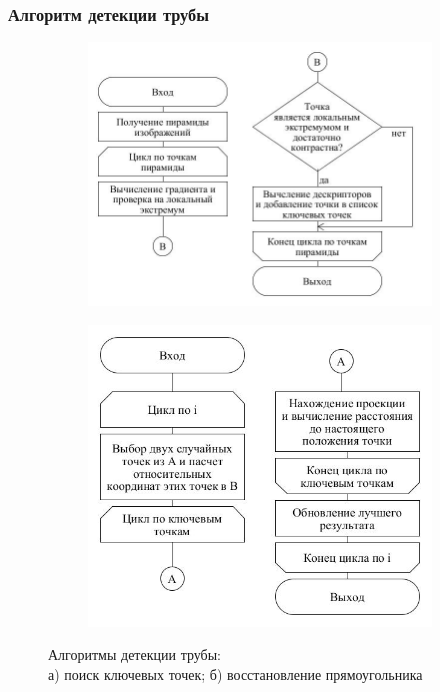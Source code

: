 \documentclass[t]{beamer}
\begin{document}
	\begin{frame}
		\frametitle{Алгоритм детекции трубы}
		\vspace*{-0.2cm}
		\begin{figure}[ht!]
			\begin{subfigure}{.51\textwidth}
				\centering
				\includegraphics[width = \textwidth]{image/trubadetection}
				\vspace*{-0.6cm}
				\caption{}
			\end{subfigure}
			\begin{subfigure}{.46\textwidth}
				\centering
				\includegraphics[width = \textwidth]{image/RanSaC}
				\vspace*{-0.6cm}
				\caption{}
			\end{subfigure}
			\centering
			\vspace*{-0.3cm}
			\caption{Алгоритмы детекции трубы:\\ а) поиск ключевых точек; б) восстановление прямоугольника}
			\label{fig:Examples}
		\end{figure}
		
	\end{frame}
	
\end{document}
